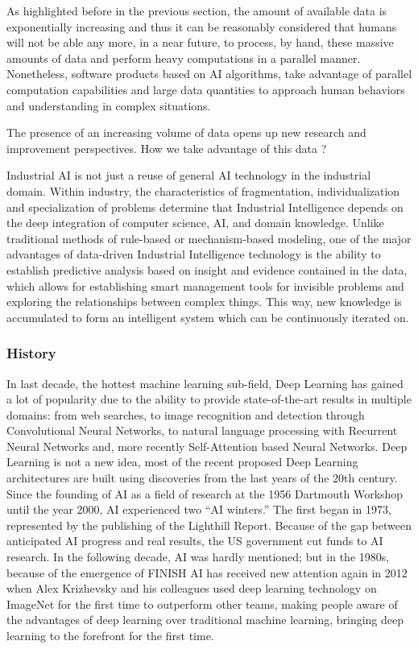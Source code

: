 As highlighted before in the previous section, the amount of available data is exponentially increasing and thus it can be reasonably considered that humans will not be able any more, in a near future, to process, by hand, these massive amounts of data and perform heavy computations in a parallel manner. Nonetheless, software products based on AI algorithms, take advantage of parallel computation capabilities and large data quantities to approach human behaviors and understanding in complex situations.

The presence of an increasing volume of data opens up new research and improvement perspectives. How we take advantage of this data ?  

Industrial AI is not just a reuse of general AI technology in the industrial domain. Within industry, the characteristics of fragmentation, individualization and specialization
of problems determine that Industrial Intelligence depends on the deep integration of computer science, AI, and domain knowledge. Unlike traditional methods of rule-based or mechanism-based modeling, one of the major advantages of data-driven Industrial Intelligence technology is the ability to establish predictive analysis based on insight and evidence contained in the data, which allows for establishing smart management tools for invisible problems and exploring the relationships between complex things. This way, new knowledge is accumulated to form an intelligent system which can be continuously iterated on.

\subsubsection{History}
In last decade, the hottest machine learning sub-field, Deep Learning has gained a lot of popularity due to the ability to provide state-of-the-art results in multiple domains: from web searches, to image recognition and detection through Convolutional Neural Networks, to natural language processing with Recurrent Neural Networks and, more recently Self-Attention based Neural Networks. Deep Learning is not a new idea, most of the recent proposed Deep Learning architectures are built using discoveries from the last years of the 20th century. Since the founding of AI as a field of research at the 1956 Dartmouth Workshop until the year 2000, AI experienced two “AI winters.” The first began in 1973, represented by the publishing of the Lighthill Report. Because of the gap between anticipated AI progress and real results, the US government cut funds to AI research. In the following decade, AI was hardly mentioned; but in the 1980s, because of the emergence of FINISH
AI has received new attention again in 2012 when Alex Krizhevsky and his colleagues used deep learning technology \citep{krizhevsky2012imagenet} on ImageNet for the first time to outperform other teams, making people aware of the advantages of deep learning over traditional machine learning, bringing deep learning to the forefront for the first time. 

